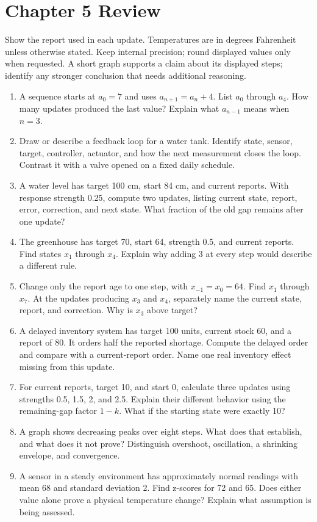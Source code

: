 \documentclass[11pt,letterpaper]{article}
\begin{document}
\section*{Chapter 5 Review}
Show the report used in each update. Temperatures are in degrees Fahrenheit unless otherwise stated. Keep internal precision; round displayed values only when requested. A short graph supports a claim about its displayed steps; identify any stronger conclusion that needs additional reasoning.
\begin{enumerate}
\item A sequence starts at $a_0=7$ and uses $a_{n+1}=a_n+4$. List $a_0$ through $a_4$. How many updates produced the last value? Explain what $a_{n-1}$ means when $n=3$.
\item Draw or describe a feedback loop for a water tank. Identify state, sensor, target, controller, actuator, and how the next measurement closes the loop. Contrast it with a valve opened on a fixed daily schedule.
\item A water level has target 100 cm, start 84 cm, and current reports. With response strength 0.25, compute two updates, listing current state, report, error, correction, and next state. What fraction of the old gap remains after one update?
\item The greenhouse has target 70, start 64, strength 0.5, and current reports. Find states $x_1$ through $x_4$. Explain why adding 3 at every step would describe a different rule.
\item Change only the report age to one step, with $x_{-1}=x_0=64$. Find $x_1$ through $x_7$. At the updates producing $x_3$ and $x_4$, separately name the current state, report, and correction. Why is $x_3$ above target?
\item A delayed inventory system has target 100 units, current stock 60, and a report of 80. It orders half the reported shortage. Compute the delayed order and compare with a current-report order. Name one real inventory effect missing from this update.
\item For current reports, target 10, and start 0, calculate three updates using strengths 0.5, 1.5, 2, and 2.5. Explain their different behavior using the remaining-gap factor $1-k$. What if the starting state were exactly 10?
\item A graph shows decreasing peaks over eight steps. What does that establish, and what does it not prove? Distinguish overshoot, oscillation, a shrinking envelope, and convergence.
\newpage
\item A sensor in a steady environment has approximately normal readings with mean 68 and standard deviation 2. Find z-scores for 72 and 65. Does either value alone prove a physical temperature change? Explain what assumption is being assessed.

\end{enumerate}
\end{document}
